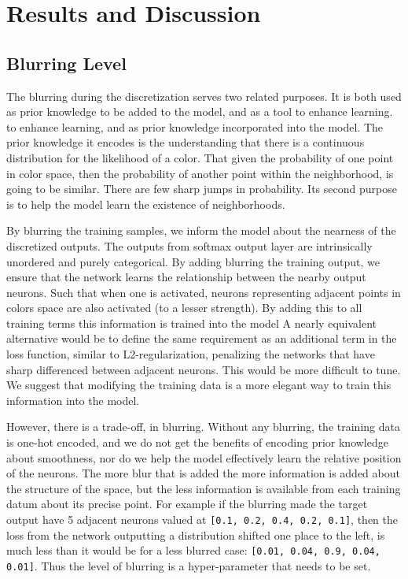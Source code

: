 \documentclass[11pt,letterpaper]{article}
\begin{document}
\section{Results and Discussion}

\subsection{Blurring Level}
The blurring during the discretization serves two related purposes.
It is both used as prior knowledge to be added to the model, and as a tool to enhance learning.
to enhance learning, and as prior knowledge incorporated into the model. 
The prior knowledge it encodes is the understanding that there is a continuous distribution for the likelihood of a color.
That given the probability of one point in color space, then the probability of another point within the neighborhood, is going to be similar.
There are few sharp jumps in probability.
Its second purpose is to help the model learn the existence of neighborhoods.

By blurring the training samples, we inform the model about the nearness of the discretized outputs.
The outputs from softmax output layer are intrinsically unordered and purely categorical.
By adding blurring the training output, we ensure that the network learns the relationship between the nearby output neurons.
Such that when one is activated, neurons representing  adjacent points in colors space are also activated (to a lesser strength).
By adding this to all training terms this information is trained into the model
A nearly equivalent alternative would be to define the same requirement as an additional term in the loss function, similar to L2-regularization, penalizing the networks that have sharp differenced between adjacent neurons.
This would be more difficult to tune.
We suggest that modifying the training data is a more elegant way to train this information into the model.

However, there is a trade-off, in blurring.
Without any blurring, the training data is one-hot encoded, and we do not get the benefits of encoding prior knowledge about smoothness, nor do we help the model effectively learn the relative position of the neurons.
The more blur that is added the more information is added about the structure of the space,
but the less information is available from each training datum about its precise point.
For example if the blurring made the target output have 5 adjacent neurons valued at \texttt{[0.1, 0.2, 0.4, 0.2, 0.1]}, then the loss from the network outputting a distribution shifted one place to the left, is much less than it would be for a less blurred case: \texttt{[0.01, 0.04, 0.9, 0.04, 0.01]}.
Thus the level of blurring is a hyper-parameter that needs to be set.
\end{document}
